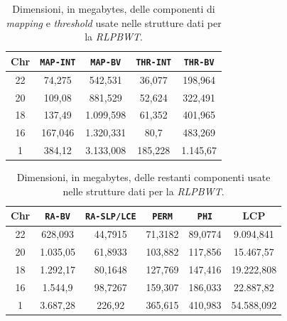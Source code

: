 \begin{table}
  \centering
  \caption{Dimensioni, in megabytes, delle componenti di
    \textit{mapping} e \textit{threshold} usate nelle
    strutture dati per la \textit{RLPBWT}.} 
  \label{tab:comp}
  \begin{tabular}{c||c|c|c|c}
    Chr & \texttt{MAP-INT} & \texttt{MAP-BV} & \texttt{THR-INT}
    & \texttt{THR-BV}  \\ \hline
    22 & 74,275 & 542,531 & 36,077 & 198,964\\ \hline
    20 & 109,08 & 881,529 & 52,624 & 322,491\\ \hline
    18 & 137,49 & 1.099,598 & 61,352 & 401,965\\ \hline
    16 & 167,046 & 1.320,331 & 80,7 & 483,269\\ \hline
    1 & 384,12 & 3.133,008 & 185,228 & 1.145,67
  \end{tabular}
\end{table}
\begin{table}
  \centering
  \caption{Dimensioni, in megabytes, delle restanti componenti usate nelle
    strutture dati per la \textit{RLPBWT}.} 
  \label{tab:comp2}
  \begin{tabular}{c||c|c|c|c|c}
    Chr & \texttt{RA-BV} & \texttt{RA-SLP/LCE} & \texttt{PERM} & \texttt{PHI}
    & LCP\\
    \hline
    22 & 628,093 & 44,7915 & 71,3182 & 89,0774 & 9.094,841\\ \hline
    20 & 1.035,05 & 61,8933 & 103,882 & 117,856 & 15.467,57 \\ \hline
    18 & 1.292,17 & 80,1648 & 127,769 & 147,416 & 19.222,808\\ \hline
    16 & 1.544,9 & 98,7267 & 159,307 & 186,033 & 22.887,82\\ \hline
    1 & 3.687,28 & 226,92 & 365,615 & 410,983 & 54.588,092
  \end{tabular}
\end{table}

